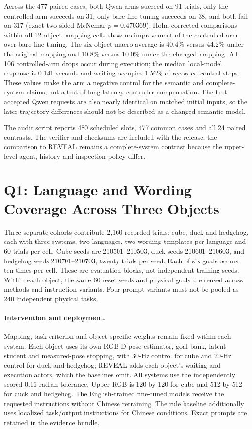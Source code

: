 Across the 477 paired cases, both Qwen arms succeed on 91 trials, only the controlled arm succeeds on 31, only bare fine-tuning succeeds on 38, and both fail on 317 (exact two-sided McNemar $p=0.470369$). Holm-corrected comparisons within all 12 object--mapping cells show no improvement of the controlled arm over bare fine-tuning. The six-object macro-average is 40.4\% versus 44.2\% under the original mapping and 10.8\% versus 10.0\% under the changed mapping. All 106 controlled-arm drops occur during execution; the median local-model response is 0.141 seconds and waiting occupies 1.56\% of recorded control steps. These values make the arm a negative control for the semantic and complete-system claims, not a test of long-latency controller compensation. The first accepted Qwen requests are also nearly identical on matched initial inputs, so the later trajectory differences should not be described as a changed semantic model.

The audit script reports 480 scheduled slots, 477 common cases and all 24 paired contrasts. The verifier and checksums are included with the release; the comparison to REVEAL remains a complete-system contrast because the upper-level agent, history and inspection policy differ.

\section{Q1: Language and Wording Coverage Across Three Objects}
\label{sec:language-supp}
Three separate cohorts contribute 2,160 recorded trials: cube, duck and hedgehog, each with three systems, two languages, two wording templates per language and 60 trials per cell. Cube seeds are 210501--210503, duck seeds 210601--210603, and hedgehog seeds 210701--210703, twenty trials per seed. Each of six goals occurs ten times per cell. These are evaluation blocks, not independent training seeds. Within each object, the same 60 reset seeds and physical goals are reused across methods and instruction variants. Four prompt variants must not be pooled as 240 independent physical tasks.

\paragraph{Intervention and deployment.}
Mapping, task criterion and object-specific weights remain fixed within each system. Each object uses its own RGB-D pose estimator, goal bank, latent student and measured-pose stopping, with 30-Hz control for cube and 20-Hz control for duck and hedgehog; REVEAL adds each object's waiting and execution actors, which the baselines omit. All systems use the independently scored 0.16-radian tolerance. Upper RGB is 120-by-120 for cube and 512-by-512 for duck and hedgehog. The English-trained fine-tuned models receive the requested instructions without Chinese retraining. The rule baseline additionally uses localized task/output instructions for Chinese conditions. Exact prompts are retained in the evidence bundle.

